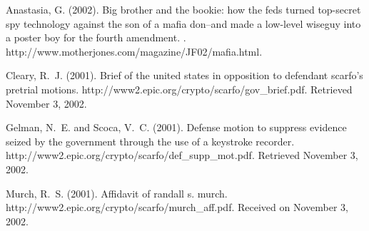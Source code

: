 \documentclass[12pt,titlepage]{article}             %
\begin{document}
\begin{thebibliography}{}

Anastasia, G. (2002).
\newblock Big brother and the bookie: how the feds turned top-secret spy
  technology against the son of a mafia don--and made a low-level wiseguy into
  a poster boy for the fourth amendment.
.
\newblock http://www.motherjones.com/magazine/JF02/mafia.html.

Cleary, R.~J. (2001).
\newblock Brief of the united states in opposition to defendant scarfo's
  pretrial motions.
\newblock http://www2.epic.org/crypto/scarfo/gov\_brief.pdf.
\newblock Retrieved November 3, 2002.

Gelman, N.~E. and Scoca, V.~C. (2001).
\newblock Defense motion to suppress evidence seized by the government through
  the use of a keystroke recorder.
\newblock http://www2.epic.org/crypto/scarfo/def\_supp\_mot.pdf.
\newblock Retrieved November 3, 2002.

Murch, R.~S. (2001).
\newblock Affidavit of randall s. murch.
\newblock http://www2.epic.org/crypto/scarfo/murch\_aff.pdf.
\newblock Received on November 3, 2002.

\end{thebibliography}
\end{document}
